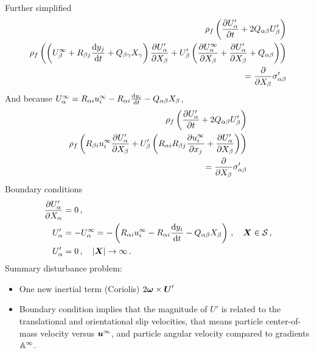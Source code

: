 \documentclass[thesis.tex]{subfiles}
\begin{document}
Further simplified
\begin{align}
    \rho_f \left(\frac{\partial U'_\alpha}{\partial t} + 2Q_{\alpha \beta}U'_\beta \right) \nonumber \\
    \rho_f\left(\left(U^\infty_\beta + R_{\beta j}\frac{\mathrm{d} y_j}{\mathrm{d} t}+Q_{\beta \gamma}X_\gamma\right)\frac{\partial U'_\alpha}{\partial X_\beta}+U'_\beta\left(\frac{\partial U^\infty_\alpha}{\partial X_\beta}+\frac{\partial U'_\alpha}{\partial X_\beta}+Q_{\alpha \beta}\right)\right)\nonumber\\
   = \frac{\partial }{\partial X_\beta} \sigma'_{\alpha \beta}
\end{align}
And because $U^\infty_\alpha = R_{\alpha i}u^\infty_i - R_{\alpha i}\frac{\mathrm{d} y_i}{\mathrm{d} t} - Q_{\alpha \beta} X_\beta$,
\begin{align}
    \rho_f \left(\frac{\partial U'_\alpha}{\partial t} + 2Q_{\alpha \beta}U'_\beta \right) \nonumber \\
    \rho_f\left(R_{\beta i}u^\infty_i\frac{\partial U'_\alpha}{\partial X_\beta}+U'_\beta\left(R_{\alpha i}R_{\beta j}\frac{\partial u^\infty_i}{\partial x_j}+\frac{\partial U'_\alpha}{\partial X_\beta}\right)\right)\nonumber\\
   = \frac{\partial }{\partial X_\beta} \sigma'_{\alpha \beta}
\end{align}
Boundary conditions
\begin{align}
    \frac{\partial U'_\alpha}{\partial X_\alpha} &= 0\,, \\
    U'_\alpha &= -U^\infty_\alpha=-\left(R_{\alpha i}u^\infty_i - R_{\alpha i}\frac{\mathrm{d} y_i}{\mathrm{d} t} - Q_{\alpha \beta} X_\beta\right)\,,\quad \mbox{\boldmath$X$} \in \mathcal S\,, \\
    U'_\alpha &= 0\,,\quad|\mbox{\boldmath$X$}|\to\infty\,.
\end{align}
Summary disturbance problem:
\begin{itemize}
    \item One new inertial term (Coriolis) $2\mbox{\boldmath$\omega$} \times \mbox{\boldmath$U$}'$
    \item Boundary condition implies that the magnitude of $U'$ is related to the translational and orientational slip velocities, that means particle center-of-mass velocity versus $\mbox{\boldmath$u$}^\infty$, and particle angular velocity compared to gradients $\mathbb{A}^\infty$.
\end{itemize}
\end{document}
